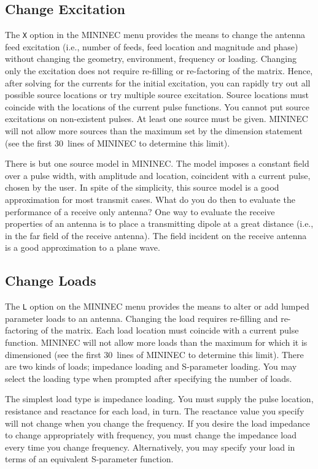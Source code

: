\documentclass[12pt]{article}
\begin{document}
\subsection{Change Excitation}
The \verb+X+ option in the MININEC menu provides the means to change the
antenna feed excitation (i.e., number of feeds, feed location and
magnitude and phase) without changing the geometry, environment,
frequency or loading. Changing only the excitation does not require
re-filling or re-factoring of the matrix. Hence, after solving for the
currents for the initial excitation, you can rapidly try out all
possible source locations or try multiple source excitation. Source
locations must coincide with the locations of the current pulse
functions. You cannot put source excitations on non-existent pulses. At
least one source must be given. MININEC will not allow more sources than
the maximum set by the dimension statement (see the first 30~lines of
MININEC to determine this limit).

There is but one source model in MININEC. The model imposes a constant
field over a pulse width, with amplitude and location, coincident with a
current pulse, chosen by the user. In spite of the simplicity, this
source model is a good approximation for most transmit cases. What do
you do then to evaluate the performance of a receive only antenna? One
way to evaluate the receive properties of an antenna is to place a
transmitting dipole at a great distance (i.e., in the far field of the
receive antenna). The field incident on the receive antenna is a good
approximation to a plane wave.

\subsection{Change Loads}
\label{sec-loads}
The \verb+L+ option on the MININEC menu provides the means to alter or
add lumped parameter loads to an antenna. Changing the load requires
re-filling and re-factoring of the matrix. Each load location must
coincide with a current pulse function. MININEC will not allow more
loads than the maximum for which it is dimensioned (see the first
30~lines of MININEC to determine this limit). There are two kinds of
loads; impedance loading and S-parameter loading. You may select the
loading type when prompted after specifying the number of loads.

The simplest load type is impedance loading. You must supply the pulse
location, resistance and reactance for each load, in turn. The reactance
value you specify will not change when you change the frequency. If you
desire the load impedance to change appropriately with frequency, you
must change the impedance load every time you change frequency.
Alternatively, you may specify your load in terms of an equivalent
S-parameter function.
\end{document}
